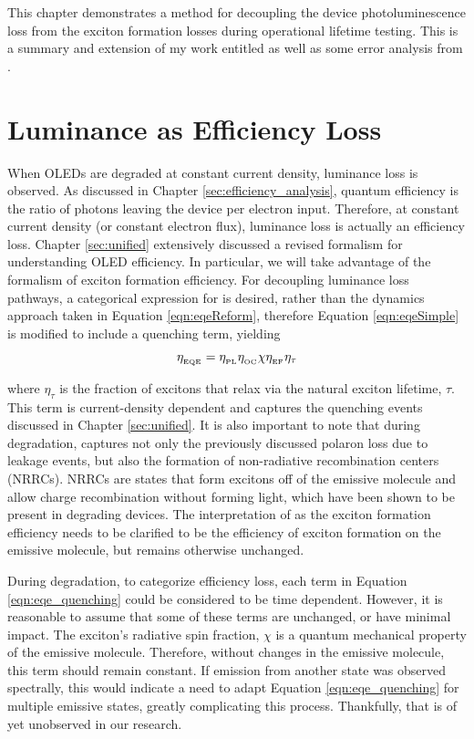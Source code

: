 \documentclass[../thesis.tex]{subfiles}
\begin{document}
This chapter demonstrates a method for decoupling the device photoluminescence loss from the exciton formation losses during operational lifetime testing.  
This is a summary and extension of my work entitled \textcite{Hershey2017} as well as some error analysis from \textcite{Bangsund2018a}.

\section{Luminance as Efficiency Loss}

When OLEDs are degraded at constant current density, luminance loss is observed.  
As discussed in Chapter \ref{sec:efficiency_analysis}, quantum efficiency is the ratio of photons leaving the device per electron input.
Therefore, at constant current density (or constant electron flux), luminance loss is actually an efficiency loss.
Chapter \ref{sec:unified} extensively discussed a revised formalism for understanding OLED efficiency.
In particular, we will take advantage of the formalism of exciton formation efficiency.  
For decoupling luminance loss pathways, a categorical expression for \eqe is desired, rather than the dynamics approach taken in Equation \ref{eqn:eqeReform}, therefore Equation \ref{eqn:eqeSimple} is modified to include a quenching term, yielding

\begin{equation}
\eta_{_\text{\tiny EQE}}=\eta_{_\text{\tiny PL}}\eta_{_\text{\tiny OC}}\chi\eta_{_\text{\tiny EF}}\eta_\tau
\label{eqn:eqe_quenching}
\end{equation}

where $\eta_\tau$ is the fraction of excitons that relax via the natural exciton lifetime, $\tau$.  
This term is current-density dependent and captures the quenching events discussed in Chapter \ref{sec:unified}.
It is also important to note that during degradation, \ef captures not only the previously discussed polaron loss due to leakage events, but also the formation of non-radiative recombination centers (NRRCs).
NRRCs are states that form excitons off of the emissive molecule and allow charge recombination without forming light, which have been shown to be present in degrading devices.\supercite{Kondakov2003,Kondakov2007d}
The interpretation of \ef as the exciton formation efficiency needs to be clarified to be the efficiency of exciton formation on the emissive molecule, but remains otherwise unchanged.

During degradation, to categorize efficiency loss, each term in Equation \ref{eqn:eqe_quenching} could be considered to be time dependent.  
However, it is reasonable to assume that some of these terms are unchanged, or have minimal impact.
The exciton's radiative spin fraction, $\chi$ is a quantum mechanical property of the emissive molecule.
Therefore, without changes in the emissive molecule, this term should remain constant.  
If emission from another state was observed spectrally, this would indicate a need to adapt Equation \ref{eqn:eqe_quenching} for multiple emissive states, greatly complicating this process.
Thankfully, that is of yet unobserved in our research.
\end{document}
